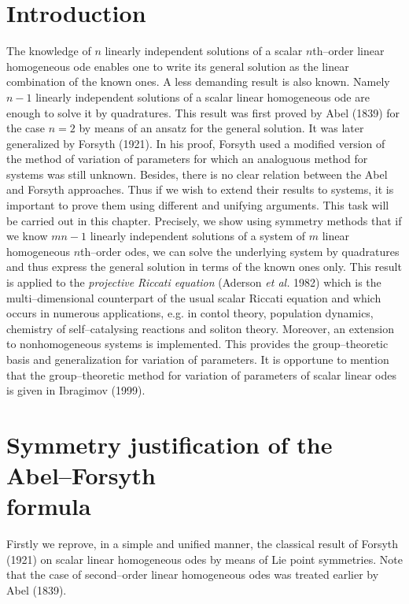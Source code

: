 \section{Introduction}
The knowledge of $n$ linearly independent solutions of
a scalar $n$th--order linear homogeneous ode enables one to write its general 
solution as the linear combination of the known ones. A less demanding
result is also
known. Namely $n-1$ linearly independent solutions of a scalar 
linear homogeneous ode are enough to solve it by quadratures. This result was
first proved by Abel (1839) for the case $n=2$ by means of an 
ansatz for the general solution. It was later generalized by
Forsyth (1921). In his proof, Forsyth used  a modified version of the
method of variation of parameters for which an analoguous method for systems
was still unknown. Besides, there is no clear relation between the
Abel and Forsyth approaches. Thus if we wish
to extend their results to systems, it is  important to prove them using
different and unifying arguments.
This task will be carried out in this chapter.
Precisely, we show using symmetry methods that if we know $mn-1$ linearly
independent solutions of a system of $m$ linear homogeneous $n$th--order odes, we can solve 
the underlying system by quadratures and thus express the general solution 
in terms of the known ones only. This result is applied to the
{\em projective Riccati equation} (Aderson {\em et al.} 1982)
which is the multi--dimensional
counterpart of the usual scalar Riccati equation and which occurs in numerous
applications, e.g. in contol theory, population dynamics, chemistry of
self--catalysing reactions and soliton theory. 
Moreover, an extension to nonhomogeneous systems is implemented.
This provides the group--theoretic basis and generalization
for variation of parameters. It is opportune to
mention that the group--theoretic method for variation of parameters of
scalar linear odes is given in Ibragimov (1999).
\section{Symmetry justification of the Abel--Forsyth \\
formula}
Firstly we reprove, in a simple and unified manner, the classical
result of Forsyth (1921) on scalar linear homogeneous odes by means
of Lie point symmetries. Note that the case of second--order linear
homogeneous odes was treated earlier by Abel (1839).

